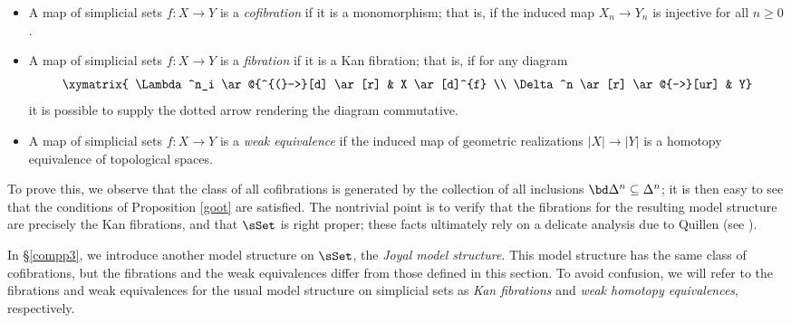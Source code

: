 \begin{Model Categories}
\begin{Didn't Read}
\begin{itemize}
\item A map of simplicial sets $f: X \rightarrow Y$ is a {\it cofibration} if it is a monomorphism; that is, if the induced map $X_n \rightarrow Y_n$ is injective for all $n \geq 0$.
\item A map of simplicial sets $f: X \rightarrow Y$ is a {\it fibration} if it is a Kan fibration; that is, if for any diagram
$$ \xymatrix{ \Lambda^n_i \ar@{^{(}->}[d] \ar[r] & X \ar[d]^{f} \\
\Delta^n \ar[r] \ar@{-->}[ur] & Y}$$
it is possible to supply the dotted arrow rendering the diagram commutative.
\item A map of simplicial sets $f: X \rightarrow Y$ is a {\it weak equivalence} if the induced map of geometric realizations $|X| \rightarrow |Y|$ is a homotopy equivalence of topological spaces.
\end{itemize}

To prove this, we observe that the class of all cofibrations is generated by the collection of all inclusions $\bd \Delta^n \subseteq \Delta^n$; it is then easy to see that the conditions of
Proposition \ref{goot} are satisfied. The nontrivial point
is to verify that the fibrations for the resulting model structure are precisely the Kan fibrations, and
that $\sSet$ is right proper; these facts ultimately rely on a delicate analysis due to Quillen (see \cite{goerssjardine}).

\begin{remark}
In \S \ref{compp3}, we introduce another model structure on $\sSet$, the {\it Joyal model structure}. This model structure has the same class of cofibrations, but the fibrations and the weak equivalences differ from those defined in this section. To avoid confusion, we will refer to the fibrations and weak equivalences for the usual model structure on simplicial sets as {\it Kan fibrations} and {\it weak homotopy equivalences}, respectively.
\end{remark}



\end{Didn't Read}
\end{Model Categories}
